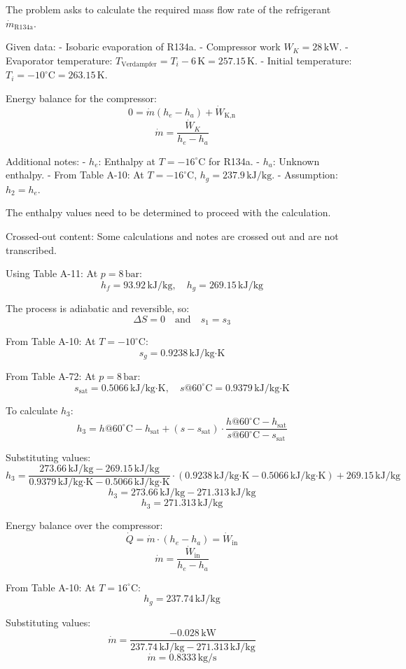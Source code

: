 The problem asks to calculate the required mass flow rate of the refrigerant \( \dot{m}_{\text{R134a}} \).  

Given data:  
- Isobaric evaporation of R134a.  
- Compressor work \( W_K = 28 \, \text{kW} \).  
- Evaporator temperature: \( T_{\text{Verdampfer}} = T_i - 6 \, \text{K} = 257.15 \, \text{K} \).  
- Initial temperature: \( T_i = -10^\circ\text{C} = 263.15 \, \text{K} \).  

Energy balance for the compressor:  
\[
0 = \dot{m} (h_e - h_a) + \dot{W}_{\text{K,n}}
\]  
\[
\dot{m} = \frac{\dot{W}_K}{h_e - h_a}
\]  

Additional notes:  
- \( h_e \): Enthalpy at \( T = -16^\circ\text{C} \) for R134a.  
- \( h_a \): Unknown enthalpy.  
- From Table A-10: At \( T = -16^\circ\text{C} \), \( h_g = 237.9 \, \text{kJ/kg} \).  
- Assumption: \( h_2 = h_e \).  

The enthalpy values need to be determined to proceed with the calculation.  

Crossed-out content:  
Some calculations and notes are crossed out and are not transcribed.

Using Table A-11:  
At \( p = 8 \, \text{bar} \):  
\[
h_f = 93.92 \, \text{kJ/kg}, \quad h_g = 269.15 \, \text{kJ/kg}
\]  

The process is adiabatic and reversible, so:  
\[
\Delta S = 0 \quad \text{and} \quad s_1 = s_3
\]  

From Table A-10:  
At \( T = -10^\circ\text{C} \):  
\[
s_g = 0.9238 \, \text{kJ/kg·K}
\]  

From Table A-72:  
At \( p = 8 \, \text{bar} \):  
\[
s_{\text{sat}} = 0.5066 \, \text{kJ/kg·K}, \quad s@60^\circ\text{C} = 0.9379 \, \text{kJ/kg·K}
\]  

To calculate \( h_3 \):  
\[
h_3 = h@60^\circ\text{C} - h_{\text{sat}} + \left( s - s_{\text{sat}} \right) \cdot \frac{h@60^\circ\text{C} - h_{\text{sat}}}{s@60^\circ\text{C} - s_{\text{sat}}}
\]  

Substituting values:  
\[
h_3 = \frac{273.66 \, \text{kJ/kg} - 269.15 \, \text{kJ/kg}}{0.9379 \, \text{kJ/kg·K} - 0.5066 \, \text{kJ/kg·K}} \cdot \left( 0.9238 \, \text{kJ/kg·K} - 0.5066 \, \text{kJ/kg·K} \right) + 269.15 \, \text{kJ/kg}
\]  
\[
h_3 = 273.66 \, \text{kJ/kg} - 271.313 \, \text{kJ/kg}
\]  
\[
h_3 = 271.313 \, \text{kJ/kg}
\]  

Energy balance over the compressor:  
\[
\dot{Q} = \dot{m} \cdot (h_e - h_a) = \dot{W}_{\text{in}}
\]  
\[
\dot{m} = \frac{\dot{W}_{\text{in}}}{h_e - h_a}
\]  

From Table A-10:  
At \( T = 16^\circ\text{C} \):  
\[
h_g = 237.74 \, \text{kJ/kg}
\]  

Substituting values:  
\[
\dot{m} = \frac{-0.028 \, \text{kW}}{237.74 \, \text{kJ/kg} - 271.313 \, \text{kJ/kg}}
\]  
\[
\dot{m} = 0.8333 \, \text{kg/s}
\]